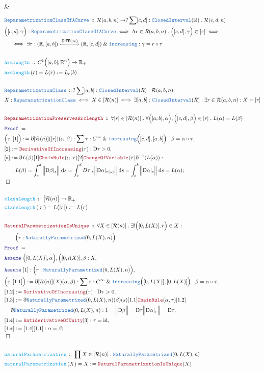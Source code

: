 \documentclass[12pt]{scrartcl}
\newcommand{\TYPE}[1]{\textcolor{NavyBlue}{\mathtt{#1}}}
\newcommand{\FUNC}[1]{\textcolor{Cerulean}{\mathtt{#1}}}
\newcommand{\LOGIC}[1]{\textcolor{Blue}{\mathtt{#1}}}
\newcommand{\THM}[1]{\textcolor{Maroon}{\mathtt{#1}}}
\renewcommand{\.}{\; . \;}
\newcommand{\de}{: \kern 0.1pc =}
\newcommand{\Act}[1]{\left( #1 \right)}
\newcommand{\Theorem}[2]{& \THM{#1} \, :: \, #2 \\ & \Proof = \\ }
\newcommand{\DeclareType}[2]{& \TYPE{#1} \, :: \, #2 \\}
\newcommand{\DefineNamedType}[4]{& #1 : \TYPE{#2} \iff #3 \iff #4 \\}
\newcommand{\DeclareFunc}[2]{& \FUNC{#1} \, :: \, #2 \\}
\newcommand{\DefineNamedFunc}[4]{&  \FUNC{#1}\Act{#2} = #3 \de #4 \\}
\newcommand{\NewLine}{\\ & \kern 1pc}
\newcommand{\Page}[1]{ \begin{align*} #1 \end{align*}   }
\newcommand{ \bd }{ \ByDef }
\newcommand{\IntBy}{\; \mathrm{d}}
\renewcommand{\And}{\; \& \;}
\newcommand{\Reals}{\mathbb{R} }
\DeclareMathOperator*{\id}{id}
\newcommand{\ToIso}{\xleftrightarrow}
\newcommand{\Say}[3]{& #1 \de #2 : #3, \\}
\newcommand{\Conclude}[3]{& #1 \de #2 : #3; \\}
\newcommand{\A}{\LOGIC{Assume} \;}
\newcommand{\Assume}[2]{& \A #1 : #2, \\}
\newcommand{\QED}{\; \square}
\newcommand{\EndProof}{& \QED \\}
\newcommand{\ByDef}{\eth}
\newcommand{\Proof}{\LOGIC{Proof} \; }
\newcommand{\DIFF}{\mathsf{DIFF}}
\newcommand{\diff}{\mathrm{D}}
\newcommand{\NP}{\TYPE{NaturallyParametrized}}
\newcommand{\R}{\mathcal{R}}
\begin{document}
{	\EndProof
}\Page{
	\DeclareType{ReparametrizationClassOfACurve}{\R(a,b,n) \to ? \sum [c,d] : \TYPE{ClosedInterval}(\Reals) \. \R(c,d,n)}
	\DefineNamedType{\Big([c,d],\gamma\Big)}{ReparametrizationClassOfACurve}{\Lambda r \in R(a,b,n) \. \Big([c,d],\gamma \Big) \in [r]}
	{\NewLine \iff \exists \tau : (\Reals,[a,b]) \ToIso{\DIFF(\infty)} (\Reals,[c,d]) \And \TYPE{increasing} : \gamma = r \circ \tau}
	\\
	\DeclareFunc{arclength}{C^1\Big([a,b],\Reals^n\Big) \to \Reals_+}
	\DefineNamedFunc{arclength}{r}{L(r)}{L_r(b)}
	\\
	\DeclareType{ReparametrizationClass}{  ? \sum [a,b] : \TYPE{ClosedInterval}(R) \. \R(a,b,n)}
	\DefineNamedType{X}{ReparametrizationClass}{X \in [\R(n)]}{\exists [a,b] : \TYPE{ClosedInterval}(R) : \exists r \in \R(a,b,n) : X = [r] }
	\\
	\Theorem{ReparametrizationPreservesArclength}{\forall [r] \in [\R(n)] \. 
		\forall \Big([a,b] ,\alpha\Big), \Big([c,d],\beta\Big) \in [r] \. L(\alpha) = L(\beta)}
	\Say{\Big(\tau,[1]\Big)}{\bd [\R(n)]([r]) (\alpha,\beta)}
	{ \sum \tau : C^\infty \And \TYPE{increasing}\Big([c,d],[a,b]\Big) \. \beta = \alpha \circ \tau}
	\Say{[2]}{\THM{DerivativeOfIncreasing}(\tau)}{ \diff \tau > 0}
	\Conclude{[*]}{\bd L(\beta) [1]\THM{ChainRule}(\alpha,\tau)[2]\THM{ChangeOfVariable}(\tau)\bd^{-1}(L(\alpha))}{
		\NewLine :
		L(\beta) = \int_c^d \Big\| \diff \beta |_s \Big\| \IntBy s  = 
		\int_c^d D\tau|_s\Big\| \diff\alpha |_{\tau(s)} \Big\| \IntBy s =
		\int_a^b \Big\| \diff\alpha |_s \Big\| \IntBy s = L(\alpha)
	}
	\EndProof
	\\
	\DeclareFunc{classLength}{\big[\R(n)\big] \to \Reals_+}
	\DefineNamedFunc{classLength}{[r]}{L\big([r]\big)}{L\big(r\big)}
	\\
	\Theorem{NaturalParametrizationIsUnique}{\forall X \in [\R(n)] \. \exists! \Big([0,L(X)],r\Big) \in X : \NewLine 
		: \Big(r : \NP(0,L(X),n)\Big)}
	\Assume{\Big([0,L(X)],\alpha \Big),\Big([0,l(X)],\beta}{X}
	\Assume{[1]}{\Big(r : \NP(0,L(X),n)\Big)}
	\Say{\Big(\tau,[1.1]\Big)}{\bd [\R(n)](X)(\alpha,\beta)}
	{ \sum \tau : C^\infty \And \TYPE{increasing}\Big([0,L(X)],[0,L(X)]\Big) \. \beta = \alpha \circ \tau}
	\Say{[1.2]}{\THM{DerivativeOfIncreasing}(\tau)}{ \diff \tau > 0}
	\Say{[1.3]}{ \bd \NP(0,L(X),n)(\beta)(s)[1.1]\THM{ChainRule}(\alpha,\tau)[1.2]\NewLine\bd\NP(0,L(X),n)}
	{
		1 = 
		\Big\| \diff \beta   \Big\| = 
		\diff \tau  \Big\| \diff \alpha |_\tau \Big\| = 
		\diff \tau  
	}
	\Say{[1.4]}{\THM{AntiderivativeOfUnity}[3]}{\tau = \id}
	\Conclude{[1.*]}{[1.4][1.1]}{\alpha = \beta}
	\EndProof
	\\
	\DeclareFunc{naturalParametrization}{\prod X \in [\R(n)] \. \NP(0,L(X),n)}
	\DefineNamedFunc{naturalParametrization}{X}{X}{\THM{NaturalParametrizationIsUnique}(X)}
}
\newpage
\end{document}
